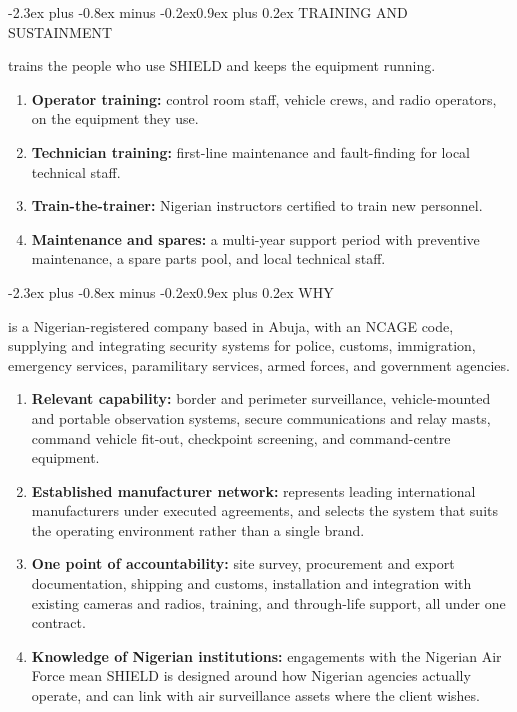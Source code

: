 \documentclass[10pt,letterpaper]{article}
\makeatletter
\renewcommand\section{\@startsection{section}{1}{0pt}%
  {-2.3ex plus -0.8ex minus -0.2ex}{0.9ex plus 0.2ex}%
  {\color{SDSSNavy}\large\bfseries}}
\makeatother
\begin{document}
\section{TRAINING AND SUSTAINMENT}

\CompanyShort{} trains the people who use SHIELD and keeps the equipment running.

\begin{enumerate}[label=\alph*.,leftmargin=2em,itemsep=5pt]
  \item \textbf{Operator training:} control room staff, vehicle crews, and radio operators, on the equipment they use.
  \item \textbf{Technician training:} first-line maintenance and fault-finding for local technical staff.
  \item \textbf{Train-the-trainer:} Nigerian instructors certified to train new personnel.
  \item \textbf{Maintenance and spares:} a multi-year support period with preventive maintenance, a spare parts pool, and local technical staff.
\end{enumerate}

\section{WHY \MakeUppercase{\CompanyShort}}

\CompanyShort{} is a Nigerian-registered company based in Abuja, with an NCAGE code, supplying and integrating security systems for police, customs, immigration, emergency services, paramilitary services, armed forces, and government agencies.

\begin{enumerate}[label=\alph*.,leftmargin=2em,itemsep=6pt]
  \item \textbf{Relevant capability:} border and perimeter surveillance, vehicle-mounted and portable observation systems, secure communications and relay masts, command vehicle fit-out, checkpoint screening, and command-centre equipment.
  \item \textbf{Established manufacturer network:} \CompanyShort{} represents leading international manufacturers under executed agreements, and selects the system that suits the operating environment rather than a single brand.
  \item \textbf{One point of accountability:} site survey, procurement and export documentation, shipping and customs, installation and integration with existing cameras and radios, training, and through-life support, all under one contract.
  \item \textbf{Knowledge of Nigerian institutions:} engagements with the Nigerian Air Force mean SHIELD is designed around how Nigerian agencies actually operate, and can link with air surveillance assets where the client wishes.
\end{enumerate}
\end{document}
